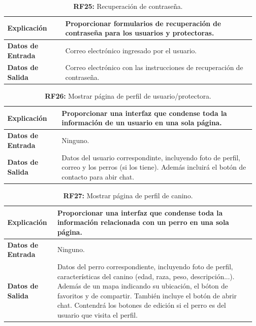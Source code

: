 \documentclass[a4paper, 12pt]{article}
\begin{document}
\begin{table}[H]
\captionsetup{justification=raggedright,singlelinecheck=false}
\caption{\textbf{RF25:} Recuperación de contraseña.}
\label{tab:RF25}
	\begin{tabular}{|m{5cm}|m{10cm}|}
	\hline
	\textbf{Explicación} & Proporcionar formularios de recuperación de contraseña para los usuarios y protectoras. \\ 
	\hline
	\textbf{Datos de Entrada} & Correo electrónico ingresado por el usuario. \\ 
	\hline
	\textbf{Datos de Salida} & Correo electrónico con las instrucciones de recuperación de contraseña. \\ 
	\hline
\end{tabular}
\end{table}

\begin{table}[H]
\captionsetup{justification=raggedright,singlelinecheck=false}
\caption{\textbf{RF26:} Mostrar página de perfil de usuario/protectora.}
\label{tab:RF26}
	\begin{tabular}{|m{5cm}|m{10cm}|}
	\hline
	\textbf{Explicación} & Proporcionar una interfaz que condense toda la información de un usuario en una sola página. \\ 
	\hline
	\textbf{Datos de Entrada} & Ninguno. \\ 
	\hline
	\textbf{Datos de Salida} & Datos del usuario correspondinte, incluyendo foto de perfil, correo y los perros (si los tiene). Además incluirá el botón de contacto para abir chat. \\ 
	\hline
\end{tabular}
\end{table}

\begin{table}[H]
\captionsetup{justification=raggedright,singlelinecheck=false}
\caption{\textbf{RF27:} Mostrar página de perfil de canino.}
\label{tab:RF27}
	\begin{tabular}{|m{5cm}|m{10cm}|}
	\hline
	\textbf{Explicación} & Proporcionar una interfaz que condense toda la información relacionada con un perro en una sola página. \\ 
	\hline
	\textbf{Datos de Entrada} & Ninguno. \\ 
	\hline
	\textbf{Datos de Salida} & Datos del perro correspondiente, incluyendo foto de perfil, características del canino (edad, raza, peso, descripción...). Además de un mapa indicando su ubicación, el bóton de favoritos y de compartir. También incluye el botón de abrir chat. Contendrá los botones de edición si el perro es del usuario que visita el perfil. \\ 
	\hline
\end{tabular}
\end{table}
\end{document}

